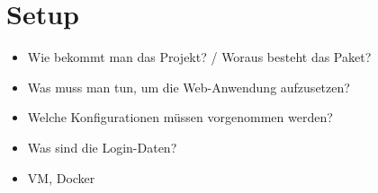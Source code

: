 \section{Setup}
\begin{itemize}
	\item Wie bekommt man das Projekt? / Woraus besteht das Paket?
	\item Was muss man tun, um die Web-Anwendung aufzusetzen? 
	\item Welche Konfigurationen müssen vorgenommen werden?
	\item Was sind die Login-Daten? 
	\item VM, Docker
\end{itemize}